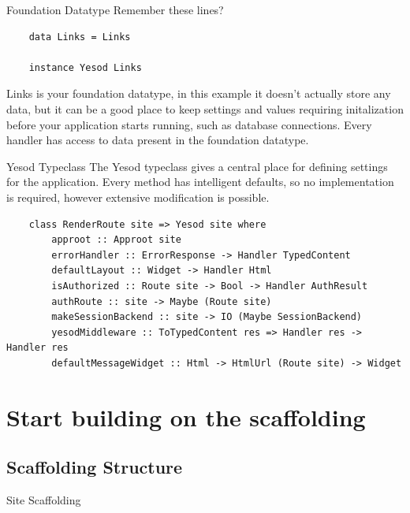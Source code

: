 \documentclass[pdf]{beamer}
\begin{document}
\begin{frame}[fragile]{Foundation Datatype}
  Remember these lines?
  \begin{verbatim}
    data Links = Links

    instance Yesod Links
  \end{verbatim}
  \pause

  Links is your foundation datatype, in this example it doesn't
  actually store any data, but it can be a good place to keep settings
  and values requiring initalization before your application starts
  running, such as database connections. Every handler has access to
  data present in the foundation datatype.
\end{frame}

\begin{frame}[fragile]{Yesod Typeclass}
  The Yesod typeclass gives a central place for defining settings for
  the application. Every method has intelligent defaults, so no
  implementation is required, however extensive modification is
  possible.

  \begin{verbatim}
    class RenderRoute site => Yesod site where
        approot :: Approot site
        errorHandler :: ErrorResponse -> Handler TypedContent
        defaultLayout :: Widget -> Handler Html
        isAuthorized :: Route site -> Bool -> Handler AuthResult
        authRoute :: site -> Maybe (Route site)
        makeSessionBackend :: site -> IO (Maybe SessionBackend)
        yesodMiddleware :: ToTypedContent res => Handler res -> Handler res
        defaultMessageWidget :: Html -> HtmlUrl (Route site) -> Widget
  \end{verbatim}
\end{frame}

\section{Start building on the scaffolding}


\subsection{Scaffolding Structure}
\begin{frame}{Site Scaffolding}
\end{frame}
\end{document}
